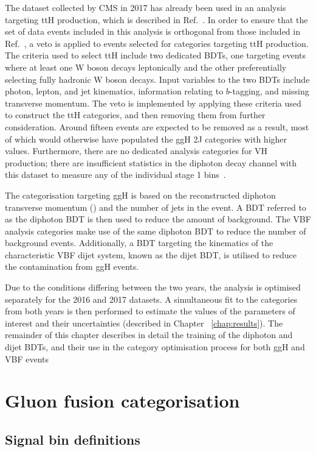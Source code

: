The dataset collected by CMS in 2017 has already been used in an analysis targeting ttH production,
which is described in Ref.~\cite{HIG-18-018}.
In order to ensure that the set of data events included in this analysis is orthogonal 
from those included in Ref.~\cite{HIG-18-018}, 
a veto is applied to events selected for categories targeting ttH production.
The criteria used to select ttH include two dedicated BDTs, 
one targeting events where at least one W boson decays leptonically
and the other preferentially selecting fully hadronic W boson decays.
Input variables to the two BDTs include photon, lepton, and jet kinematics, 
information relating to $b$-tagging, and missing transverse momentum.
The veto is implemented by applying these criteria used to construct the ttH categories, 
and then removing them from further consideration. 
Around fifteen events are expected to be removed as a result, 
most of which would otherwise have populated the ggH 2J categories with higher \ptH values.
Furthermore, there are no dedicated analysis categories for VH production; 
there are insufficient statistics in the diphoton decay channel with this dataset 
to measure any of the individual stage 1 bins~\cite{YR4}.

The categorisation targeting ggH is based on the reconstructed diphoton transverse momentum (\ptgg) 
and the number of jets in the event. 
A BDT referred to as the diphoton BDT is then used to reduce the amount of background. 
The VBF analysis categories make use of the same diphoton BDT 
to reduce the number of background events. 
Additionally, a BDT targeting the kinematics of the characteristic VBF dijet system, 
known as the dijet BDT, is utilised to reduce the contamination from ggH events.

Due to the conditions differing between the two years, 
the analysis is optimised separately for the 2016 and 2017 datasets. 
A simultaneous fit to the categories from both years is then performed to estimate the 
values of the parameters of interest and their uncertainties (described in Chapter ~\ref{chap:results}).
The remainder of this chapter describes in detail the training of the diphoton and dijet BDTs, 
and their use in the category optimisation process for both ggH and VBF events

\section{Gluon fusion categorisation}
\subsection{Signal bin definitions}

